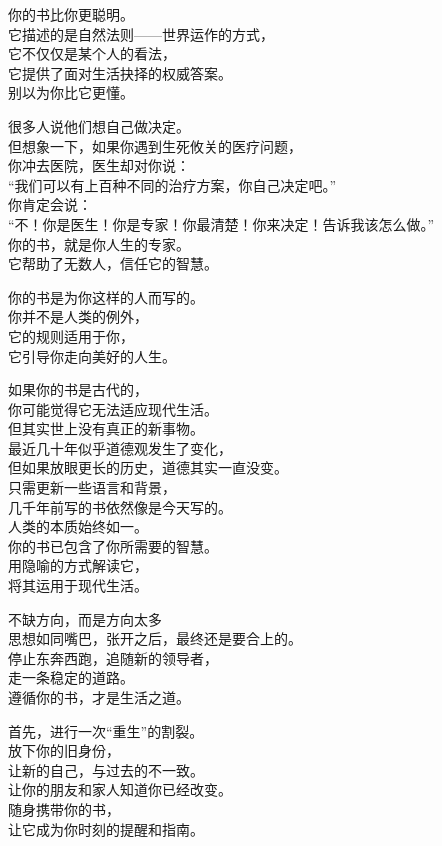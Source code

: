 \documentclass[
]{article}
\begin{document}
你的书比你更聪明。\\
它描述的是自然法则------世界运作的方式，\\
它不仅仅是某个人的看法，\\
它提供了面对生活抉择的权威答案。\\
别以为你比它更懂。

很多人说他们想自己做决定。\\
但想象一下，如果你遇到生死攸关的医疗问题，\\
你冲去医院，医生却对你说：\\
``我们可以有上百种不同的治疗方案，你自己决定吧。''\\
你肯定会说：\\
``不！你是医生！你是专家！你最清楚！你来决定！告诉我该怎么做。''\\
你的书，就是你人生的专家。\\
它帮助了无数人，信任它的智慧。

你的书是为你这样的人而写的。\\
你并不是人类的例外，\\
它的规则适用于你，\\
它引导你走向美好的人生。

如果你的书是古代的，\\
你可能觉得它无法适应现代生活。\\
但其实世上没有真正的新事物。\\
最近几十年似乎道德观发生了变化，\\
但如果放眼更长的历史，道德其实一直没变。\\
只需更新一些语言和背景，\\
几千年前写的书依然像是今天写的。\\
人类的本质始终如一。\\
你的书已包含了你所需要的智慧。\\
用隐喻的方式解读它，\\
将其运用于现代生活。

不缺方向，而是方向太多\\
思想如同嘴巴，张开之后，最终还是要合上的。\\
停止东奔西跑，追随新的领导者，\\
走一条稳定的道路。\\
遵循你的书，才是生活之道。

首先，进行一次``重生''的割裂。\\
放下你的旧身份，\\
让新的自己，与过去的不一致。\\
让你的朋友和家人知道你已经改变。\\
随身携带你的书，\\
让它成为你时刻的提醒和指南。
\end{document}
